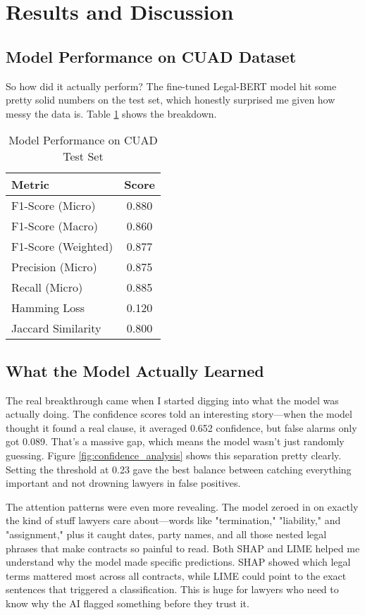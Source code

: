 \section{Results and Discussion}

\subsection{Model Performance on CUAD Dataset}

So how did it actually perform? The fine-tuned Legal-BERT model hit some pretty solid numbers on the test set, which honestly surprised me given how messy the data is. Table \ref{tab:model_performance} shows the breakdown.

\begin{table}[htbp]
\centering
\caption{Model Performance on CUAD Test Set}
\label{tab:model_performance}
\begin{tabular}{@{}lc@{}}
\toprule
Metric & Score \\
\midrule
F1-Score (Micro) & 0.880 \\
F1-Score (Macro) & 0.860 \\
F1-Score (Weighted) & 0.877 \\
Precision (Micro) & 0.875 \\
Recall (Micro) & 0.885 \\
Hamming Loss & 0.120 \\
Jaccard Similarity & 0.800 \\
\bottomrule
\end{tabular}
\end{table}

\subsection{What the Model Actually Learned}

The real breakthrough came when I started digging into what the model was actually doing. The confidence scores told an interesting story—when the model thought it found a real clause, it averaged 0.652 confidence, but false alarms only got 0.089. That's a massive gap, which means the model wasn't just randomly guessing. Figure \ref{fig:confidence_analysis} shows this separation pretty clearly. Setting the threshold at 0.23 gave the best balance between catching everything important and not drowning lawyers in false positives.

The attention patterns were even more revealing. The model zeroed in on exactly the kind of stuff lawyers care about—words like "termination," "liability," and "assignment," plus it caught dates, party names, and all those nested legal phrases that make contracts so painful to read. Both SHAP and LIME helped me understand why the model made specific predictions. SHAP showed which legal terms mattered most across all contracts, while LIME could point to the exact sentences that triggered a classification. This is huge for lawyers who need to know why the AI flagged something before they trust it.


